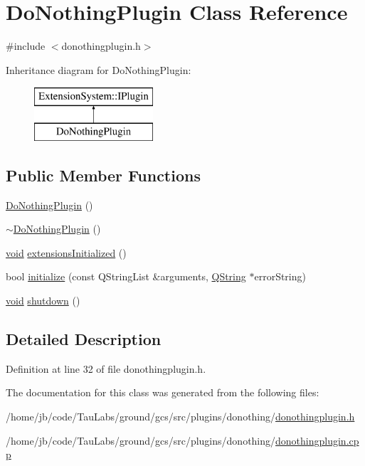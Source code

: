 \hypertarget{class_do_nothing_plugin}{\section{\-Do\-Nothing\-Plugin \-Class \-Reference}
\label{class_do_nothing_plugin}
}


{\ttfamily \#include $<$donothingplugin.\-h$>$}

\-Inheritance diagram for \-Do\-Nothing\-Plugin\-:\begin{figure}[H]
\begin{center}
\leavevmode
\includegraphics[height=2.000000cm]{class_do_nothing_plugin}
\end{center}
\end{figure}
\subsection*{\-Public \-Member \-Functions}
\begin{DoxyCompactItemize}
\item 
\hyperlink{group___do_nothing_plugin_ga5a69c051df33ad86daa499ac440b9097}{\-Do\-Nothing\-Plugin} ()
\item 
\hyperlink{group___do_nothing_plugin_gad61344cbd9fb9103b6e3b8f6da089030}{$\sim$\-Do\-Nothing\-Plugin} ()
\item 
\hyperlink{group___u_a_v_objects_plugin_ga444cf2ff3f0ecbe028adce838d373f5c}{void} \hyperlink{group___do_nothing_plugin_ga82d133252a7e9bba0308a0a2674541f3}{extensions\-Initialized} ()
\item 
bool \hyperlink{group___do_nothing_plugin_ga5038a5ac3f0abbd6c99a369d6d2ee9f4}{initialize} (const \-Q\-String\-List \&arguments, \hyperlink{group___u_a_v_objects_plugin_gab9d252f49c333c94a72f97ce3105a32d}{\-Q\-String} $\ast$error\-String)
\item 
\hyperlink{group___u_a_v_objects_plugin_ga444cf2ff3f0ecbe028adce838d373f5c}{void} \hyperlink{group___do_nothing_plugin_gaa91993d8fa19262963650daf59993688}{shutdown} ()
\end{DoxyCompactItemize}


\subsection{\-Detailed \-Description}


\-Definition at line 32 of file donothingplugin.\-h.



\-The documentation for this class was generated from the following files\-:\begin{DoxyCompactItemize}
\item 
/home/jb/code/\-Tau\-Labs/ground/gcs/src/plugins/donothing/\hyperlink{donothingplugin_8h}{donothingplugin.\-h}\item 
/home/jb/code/\-Tau\-Labs/ground/gcs/src/plugins/donothing/\hyperlink{donothingplugin_8cpp}{donothingplugin.\-cpp}\end{DoxyCompactItemize}
